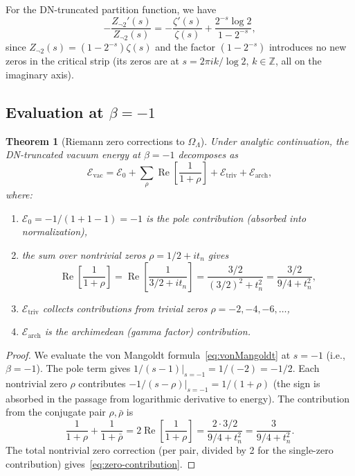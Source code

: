 \documentclass[12pt,a4paper]{article}
\newtheorem{theorem}{Theorem}[section]
\newcommand{\OL}{\Omega_\Lambda}
\begin{document}
For the DN-truncated partition function, we have
\begin{equation}
  -\frac{Z_{\neg 2}'(s)}{Z_{\neg 2}(s)} = -\frac{\zeta'(s)}{\zeta(s)} + \frac{2^{-s}\log 2}{1-2^{-s}},
\end{equation}
since $Z_{\neg 2}(s) = (1-2^{-s})\zeta(s)$ and the factor $(1-2^{-s})$ introduces no new zeros in the critical strip (its zeros are at $s = 2\pi i k/\log 2$, $k \in \mathbb{Z}$, all on the imaginary axis).

\subsection{Evaluation at $\beta = -1$}

\begin{theorem}[Riemann zero corrections to $\OL$]\label{thm:main}
Under analytic continuation, the DN-truncated vacuum energy at $\beta = -1$ decomposes as
\begin{equation}\label{eq:main-decomposition}
  \mathcal{E}_{\mathrm{vac}} = \mathcal{E}_0 + \sum_{\rho}\operatorname{Re}\!\left[\frac{1}{1+\rho}\right] + \mathcal{E}_{\mathrm{triv}} + \mathcal{E}_{\mathrm{arch}},
\end{equation}
where:
\begin{enumerate}[label=(\alph*)]
\item $\mathcal{E}_0 = -1/(1+1-1) = -1$ is the pole contribution (absorbed into normalization),
\item the sum over nontrivial zeros $\rho = 1/2 + it_n$ gives
\begin{equation}\label{eq:zero-contribution}
  \operatorname{Re}\!\left[\frac{1}{1+\rho}\right] = \operatorname{Re}\!\left[\frac{1}{3/2 + it_n}\right] = \frac{3/2}{(3/2)^2 + t_n^2} = \frac{3/2}{9/4 + t_n^2},
\end{equation}
\item $\mathcal{E}_{\mathrm{triv}}$ collects contributions from trivial zeros $\rho = -2, -4, -6, \ldots$,
\item $\mathcal{E}_{\mathrm{arch}}$ is the archimedean (gamma factor) contribution.
\end{enumerate}
\end{theorem}

\begin{proof}
We evaluate the von Mangoldt formula~\eqref{eq:vonMangoldt} at $s = -1$ (i.e., $\beta = -1$). The pole term gives $1/(s-1)|_{s=-1} = 1/(-2) = -1/2$. Each nontrivial zero $\rho$ contributes $-1/(s-\rho)|_{s=-1} = 1/(1+\rho)$ (the sign is absorbed in the passage from logarithmic derivative to energy). The contribution from the conjugate pair $\rho, \bar{\rho}$ is
\[
  \frac{1}{1+\rho} + \frac{1}{1+\bar{\rho}} = 2\operatorname{Re}\!\left[\frac{1}{1+\rho}\right] = \frac{2 \cdot 3/2}{9/4 + t_n^2} = \frac{3}{9/4 + t_n^2}.
\]
The total nontrivial zero correction (per pair, divided by 2 for the single-zero contribution) gives~\eqref{eq:zero-contribution}.
\end{proof}
\end{document}
